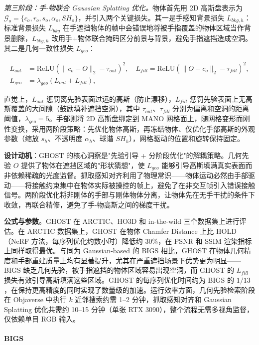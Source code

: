 \emph{第三阶段：手-物联合 Gaussian Splatting 优化。}物体首先用 2D 高斯盘表示为 $\mathcal{G}_o = \{c_o, r_o, s_o, \alpha_o, SH_o\}$，并引入两个关键损失。其一是手感知背景损失 $L_{bkg,h}$：标准背景损失 $L_{bkg}$ 在手遮挡物体的帧中会错误地将被手指覆盖的物体区域当作背景删除，$L_{bkg,h}$ 改用手+物体联合掩码区分前景与背景，避免手指遮挡造成空洞。其二是几何一致性损失 $L_{geo}$：

\begin{align}
L_{out} &= \text{ReLU}(\|c_o - O\|_2 - \tau_{out})^2, \quad L_{fill} = \text{ReLU}(\|O - c_o\|_2 - \tau_{fill})^2, \\
L_{geo} &= \lambda_{geo}(L_{out} + L_{fill}),
\end{align}

直觉上，$L_{out}$ 惩罚离先验表面过远的高斯（防止漂移），$L_{fill}$ 惩罚先验表面上无高斯覆盖的大间隙（鼓励填补遮挡空洞），其中 $\tau_{out}$、$\tau_{fill}$ 分别为偏离和空洞的距离阈值，$\lambda_{geo}=5$。手部则将 2D 高斯盘绑定到 MANO 网格面上，随网格变形而刚性变换，采用两阶段策略：先优化物体高斯，再冻结物体、仅优化手部高斯的外观参数（缩放 $s_h$、不透明度 $\alpha_h$、球谐 $SH_h$），网格驱动的位置和旋转保持固定。

\textbf{设计动机}：GHOST 的核心洞察是"先验引导 + 分阶段优化"的解耦策略。几何先验 $O$ 提供了物体在遮挡区域的"形状猜想"，使 $L_{geo}$ 能够引导高斯填满真实表面而非依赖稀疏的光度监督。抓取感知对齐利用了物理常识——物体运动必然由手部驱动——将接触约束集中在物体实际被操控的帧上，避免了在非交互帧引入错误接触信号。两阶段优化将非刚体的手部与刚体物体分离，让物体先在无手干扰的条件下收敛，再联合精修，避免了手-物高斯之间的梯度干扰。

\textbf{公式与参数}。GHOST 在 ARCTIC、HO3D 和 in-the-wild 三个数据集上进行评估。在 ARCTIC 数据集上，GHOST 在物体 Chamfer Distance 上比 HOLD（NeRF 方法，每序列优化约数小时）降低约 30\%，在 PSNR 和 SSIM 渲染指标上同样取得最优。与同为 Gaussian-based 的 BIGS 相比，GHOST 在物体几何精度和手部重建质量上均有显著提升，尤其在严重遮挡场景下优势更为明显——BIGS 缺乏几何先验，被手指遮挡的物体区域容易出现空洞，而 GHOST 的 $L_{fill}$ 损失有效引导高斯填满这些区域。GHOST 的每序列优化时间约为 BIGS 的 $1/13$，在保持更高精度的同时实现了数量级的加速。运行效率方面，几何先验检索阶段在 Objaverse 中执行 $k$ 近邻搜索约需 1--2 分钟，抓取感知对齐和 Gaussian Splatting 优化共需约 10--15 分钟（单张 RTX 3090），整个流程无需多视角监督，仅依赖单目 RGB 输入。

\paragraph{BIGS}


